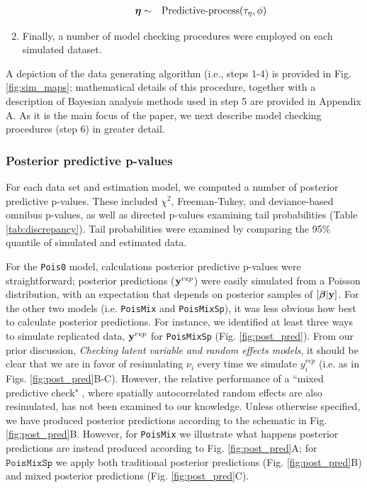 \documentclass[12pt,english]{article}
\begin{document}
\begin{spacing}{1.9}
\begin{enumerate}
\begin{itemize}
\begin{eqnarray*}
           \boldsymbol{\eta} & \sim & \textrm{Predictive-process}(\tau_\eta,\phi)
          \end{eqnarray*}
      \end{itemize}
  \item Finally, a number of model checking procedures were employed on each simulated dataset.
\end{enumerate}
A depiction of the data generating algorithm (i.e., steps 1-4) is provided in Fig. \ref{fig:sim_maps}; mathematical details of this procedure, together with a description of Bayesian analysis methods used in step 5 are provided in Appendix A.  As it is the main focus of the paper, we next describe model checking procedures (step 6) in greater detail.

\subsubsection{Posterior predictive p-values}

For each data set and estimation model, we computed a number of posterior predictive p-values.  These included $\chi^2$, Freeman-Tukey, and deviance-based omnibus p-values, as well as directed p-values examining tail probabilities (Table \ref{tab:discrepancy}). Tail probabilities were examined by comparing the 95\% quantile of simulated and estimated data.

For the \texttt{Pois0} model, calculations posterior predictive p-values were straightforward; posterior predictions (${\bf y}^{rep}$) were easily simulated from a Poisson distribution, with an expectation that depends on posterior samples of $[\boldsymbol{\beta}|{\bf y}]$.  For the other two models (i.e. \texttt{PoisMix} and \texttt{PoisMixSp}), it was less obvious how best to calculate posterior predictions.  For instance, we identified at least three ways to simulate replicated data, ${\bf y}^{rep}$ for \texttt{PoisMixSp} (Fig. \ref{fig:post_pred}).  From our prior discussion, \textit{Checking latent variable and random effects models}, it should be clear that we are in favor of resimulating $\nu_i$ every time we simulate $y_i^{rep}$ (i.e. as in Figs. \ref{fig:post_pred}B-C).  However, the relative performance of a ``mixed predictive check" \citet[][; Fig. Fig. \ref{fig:post_pred}C)]{MarshallSpiegelhalter2007}, where spatially autocorrelated random effects are also resimulated, has not been examined to our knowledge.  Unless otherwise specified, we have produced posterior predictions according to the schematic in Fig. \ref{fig:post_pred}B. However, for \texttt{PoisMix} we illustrate what happens posterior predictions are instead produced according to Fig. \ref{fig:post_pred}A; for $\texttt{PoisMixSp}$ we apply both traditional posterior predictions (Fig. \ref{fig:post_pred}B) and mixed posterior predictions (Fig. \ref{fig:post_pred}C).


\end{spacing}
\end{document}
